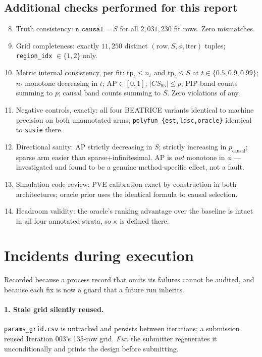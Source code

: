 \documentclass[11pt,a4paper]{article}
\newcommand{\file}[1]{\texttt{\small #1}}
\begin{document}
\subsection{Additional checks performed for this report}
\begin{enumerate}\setcounter{enumi}{7}
\item Truth consistency: $\texttt{n\_causal}=S$ for all $2{,}031{,}230$ fit
rows. Zero mismatches.
\item Grid completeness: exactly $11{,}250$ distinct
$(\text{row},S,\phi,\text{iter})$ tuples; \texttt{region\_idx} $\in\{1,2\}$ only.
\item Metric internal consistency, per fit: $\mathrm{tp}_t\le n_t$ and
$\mathrm{tp}_t\le S$ at $t\in\{0.5,0.9,0.99\}$; $n_t$ monotone decreasing in
$t$; $\mathrm{AP}\in[0,1]$; $|CS_{95}|\le p$; PIP-band counts summing to $p$;
causal band counts summing to $S$. Zero violations of any.
\item Negative controls, exactly: all four BEATRICE variants identical to
machine precision on both unannotated arms; \texttt{polyfun\_\{est,ldsc,oracle\}}
identical to \texttt{susie} there.
\item Directional sanity: AP strictly decreasing in $S$; strictly increasing in
$p_{\text{causal}}$; sparse arm easier than sparse+infinitesimal. AP is
\emph{not} monotone in $\phi$ --- investigated and found to be a genuine
method-specific effect, not a fault.
\item Simulation code review: PVE calibration exact by construction in both
architectures; oracle prior uses the identical formula to causal selection.
\item Headroom validity: the oracle's ranking advantage over the baseline is
intact in all four annotated strata, so $\kappa$ is defined there.
\end{enumerate}

\section{Incidents during execution}\label{sec:incidents}

Recorded because a process record that omits its failures cannot be audited, and
because each fix is now a guard that a future run inherits.

\paragraph{1. Stale grid silently reused.} \file{params\_grid.csv} is untracked
and persists between iterations; a submission reused Iteration 003's 135-row
grid. \emph{Fix:} the submitter regenerates it unconditionally and prints the
design before submitting.
\end{document}
